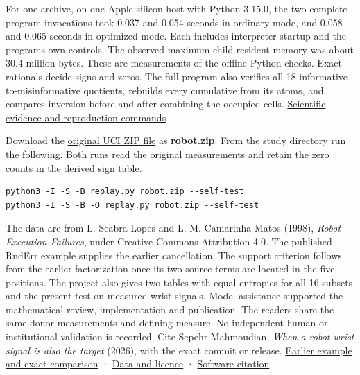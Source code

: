 For one archive, on one Apple silicon host with Python 3.15.0, the two complete program invocations took 0.037 and 0.054 seconds in ordinary mode, and 0.058 and 0.065 seconds in optimized mode. Each includes interpreter startup and the program\textquotesingle s own controls. The observed maximum child resident memory was about 30.4 million bytes. These are measurements of the offline Python checks. Exact rationals decide signs and zeros. The full program also verifies all 18 informative-to-misinformative quotients, rebuilds every cumulative from its atoms, and compares inversion before and after combining the occupied cells. \href{https://github.com/sepahead/pid-rs/blob/main/audit/research/robot-wrist-copied-target/EVIDENCE.md}{Scientific evidence and reproduction commands}

Download the \href{https://archive.ics.uci.edu/static/public/138/robot+execution+failures.zip}{original UCI ZIP file} as \textbf{robot.zip}. From the study directory run the following. Both runs read the original measurements and retain the zero counts in the derived sign table.

\begin{verbatim}
python3 -I -S -B replay.py robot.zip --self-test
python3 -I -S -B -O replay.py robot.zip --self-test
\end{verbatim}

The data are from L. Seabra Lopes and L. M. Camarinha-Matos (1998), \emph{Robot Execution Failures}, under Creative Commons Attribution 4.0. The published RndErr example supplies the earlier cancellation. The support criterion follows from the earlier factorization once its two-source terms are located in the five positions. The project also gives two tables with equal entropies for all 16 subsets and the present test on measured wrist signals. Model assistance supported the mathematical review, implementation and publication. The readers share the same donor measurements and defining measure. No independent human or institutional validation is recorded. Cite Sepehr Mahmoudian, \emph{When a robot wrist signal is also the target} (2026), with the exact commit or release. \href{https://github.com/sepahead/pid-rs/blob/main/audit/research/categorical-third-source-budget-sharpness/independent/copy-target/PRIOR-EXAMPLE.md}{Earlier example and exact comparison} · \href{https://doi.org/10.24432/C5M89N}{Data and licence} · \href{https://github.com/sepahead/pid-rs/blob/main/CITATION.cff}{Software citation}
